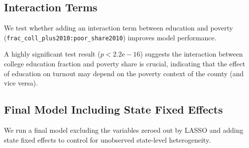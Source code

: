 \documentclass[
]{article}
\begin{document}
\subsection{Interaction Terms}\label{interaction-terms}

We test whether adding an interaction term between education and poverty (\texttt{frac\_coll\_plus2010:poor\_share2010}) improves model performance.

A highly significant test result (\(p < 2.2\mathrm{e-}16\)) suggests the interaction between college education fraction and poverty
share is crucial, indicating that the effect of education on turnout may depend on the poverty context of the
county (and vice versa).

\subsection{Final Model Including State Fixed Effects}\label{final-model-including-state-fixed-effects}

We run a final model excluding the variables zeroed out by LASSO and adding state fixed effects to control
for unobserved state-level heterogeneity.
\end{document}

